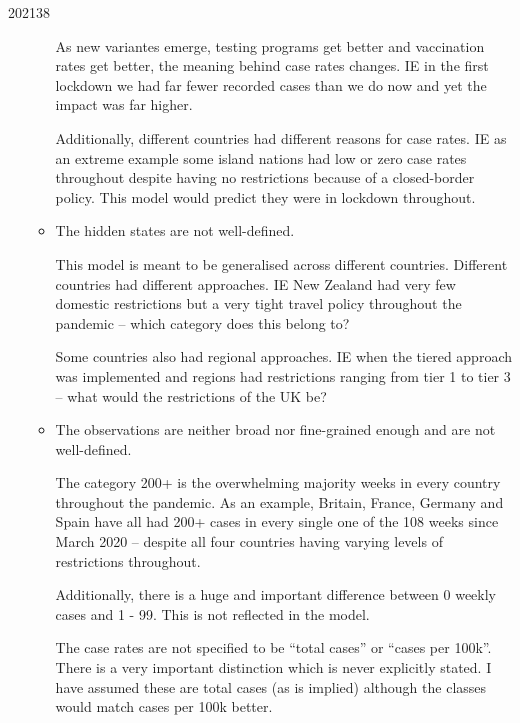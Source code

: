 \documentclass[10pt,\jkfside,a4paper]{article}
\begin{document}
\begin{examquestion}{2021}{3}{8}
\begin{enumerate}
\begin{itemize}
As new variantes emerge, testing programs get better and vaccination rates get better, the meaning 
behind case rates changes. IE in the first lockdown we had far fewer recorded cases than we do now 
and yet the impact was far higher.

Additionally, different countries had different reasons for case rates. IE as an extreme example 
some island nations had low or zero case rates throughout despite having no restrictions because 
of a closed-border policy. This model would predict they were in lockdown throughout.

\item The hidden states are not well-defined.

This model is meant to be generalised across different countries. Different countries had different approaches. 
IE New Zealand had very few domestic restrictions but a very tight travel policy throughout the pandemic -- 
which category does this belong to?

Some countries also had regional approaches. IE when the tiered approach was implemented and regions had 
restrictions ranging from tier 1 to tier 3 -- what would the restrictions of the UK be?

\item The observations are neither broad nor fine-grained enough and are not well-defined.

The category 200+ is the overwhelming majority weeks in every country throughout the pandemic. 
As an example, Britain, France, Germany and Spain have all had 200+ cases in every single one of the 
108 weeks since March 2020 -- despite all four countries having varying levels of restrictions throughout.

Additionally, there is a huge and important difference between 0 weekly cases and 1 - 99. This is not reflected 
in the model.

The case rates are not specified to be ``total cases'' or ``cases per 100k''. There is a very important 
distinction which is never explicitly stated. I have assumed these are total cases (as is implied) 
although the classes would match cases per 100k better.

\end{itemize}

\end{enumerate}

\end{examquestion}
\end{document}
